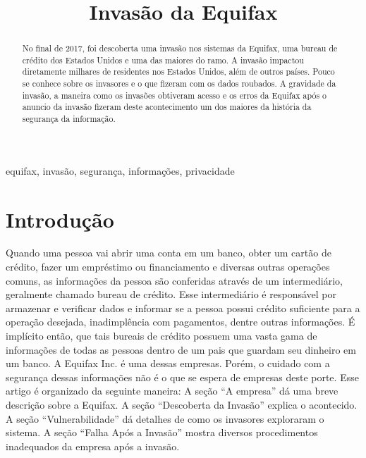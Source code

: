 \documentclass[conference]{IEEEtran}
\begin{document}
\title{Invasão da Equifax}

\author{
}

\maketitle

\begin{abstract}
No final de 2017, foi descoberta uma invasão nos sistemas da Equifax, uma bureau de crédito dos Estados Unidos e uma das maiores do ramo. A invasão impactou diretamente milhares de residentes nos
Estados Unidos, além de outros países. Pouco se conhece sobre os invasores e o que fizeram com os dados roubados. A gravidade da invasão, a maneira como os invasões obtiveram acesso e os erros da Equifax
após o anuncio da invasão fizeram deste acontecimento um dos maiores da história da segurança da informação.
\end{abstract}

\begin{IEEEkeywords}
equifax, invasão, segurança, informações, privacidade
\end{IEEEkeywords}

\section{Introdução}
Quando uma pessoa vai abrir uma conta em um banco, obter um cartão de crédito, fazer um empréstimo ou financiamento e diversas outras operações comuns, as informações da pessoa são conferidas através de um
intermediário, geralmente chamado bureau de crédito. Esse intermediário é responsável por armazenar e verificar dados e informar se a pessoa possui crédito suficiente para a operação desejada, inadimplência com pagamentos, dentre outras informações.
É implícito então, que tais bureais de crédito possuem uma vasta gama de informações de todas as pessoas dentro de um pais que guardam seu dinheiro em um banco.
A Equifax Inc. é uma dessas empresas. Porém, o cuidado com a segurança dessas informações não é o que se espera de empresas deste porte.
Esse artigo é organizado da seguinte maneira: A seção ``A empresa'' dá uma breve descrição sobre a Equifax. A seção ``Descoberta da Invasão'' explica o acontecido. 
A seção ``Vulnerabilidade'' dá detalhes de como os invasores exploraram o sistema. A seção ``Falha Após a Invasão'' mostra diversos procedimentos inadequados da empresa após a invasão.
\end{document}
